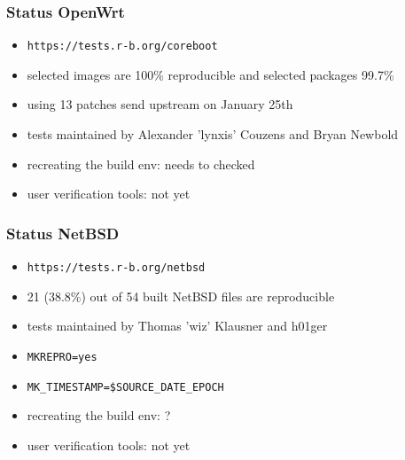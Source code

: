 \documentclass[14pt]{beamer}
\begin{document}
\begin{frame}
 \frametitle{Status OpenWrt}
 \begin{itemize}
  \item \texttt{https://tests.r-b.org/coreboot}
  \item selected images are 100\% reproducible and selected packages 99.7\%
  \item using 13 patches send upstream on January 25th
  \item tests maintained by Alexander 'lynxis' Couzens and Bryan Newbold
  \item recreating the build env: needs to checked
  \item user verification tools: not yet
 \end{itemize}
\end{frame}

\begin{frame}
 \frametitle{Status NetBSD}
 \begin{itemize}
  \item \texttt{https://tests.r-b.org/netbsd}
  \item 21 (38.8\%) out of 54 built NetBSD files are reproducible
  \item tests maintained by Thomas 'wiz' Klausner and h01ger
  \item \texttt{MKREPRO=yes}
  \item \texttt{MK\_TIMESTAMP=\$SOURCE\_DATE\_EPOCH}
  \item recreating the build env: ?
  \item user verification tools: not yet
 \end{itemize}
\end{frame}
\end{document}
